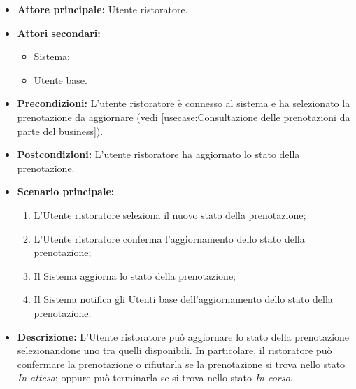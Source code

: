 \label{usecase:Aggiornamento dello stato della prenotazione da parte del business}
\begin{itemize}
	\item \textbf{Attore principale:} Utente ristoratore.

	\item \textbf{Attori secondari:}
	      \begin{itemize}
		      \item Sistema;
		      \item Utente base.
	      \end{itemize}

	\item \textbf{Precondizioni:}
	      L'utente ristoratore è connesso al sistema e ha selezionato la
	      prenotazione da aggiornare (vedi \autoref{usecase:Consultazione delle prenotazioni da parte del business}).

	\item \textbf{Postcondizioni:}
	      L'utente ristoratore ha aggiornato lo stato della prenotazione.

	\item \textbf{Scenario principale:}
	      \begin{enumerate}
		      \item L'Utente ristoratore seleziona il nuovo stato della prenotazione;
		      \item L'Utente ristoratore conferma l'aggiornamento dello stato della
		            prenotazione;
		      \item Il Sistema aggiorna lo stato della prenotazione;
		      \item Il Sistema notifica gli Utenti base dell'aggiornamento dello stato
		            della prenotazione.

	      \end{enumerate}

	\item \textbf{Descrizione:}
	      L'Utente ristoratore può aggiornare lo stato della prenotazione
	      selezionandone uno tra quelli disponibili. In particolare, il
	      ristoratore può confermare la prenotazione o rifiutarla se la
	      prenotazione si trova nello stato \textit{In attesa}; oppure può
	      terminarla se si trova nello stato \textit{In corso}.
\end{itemize}
